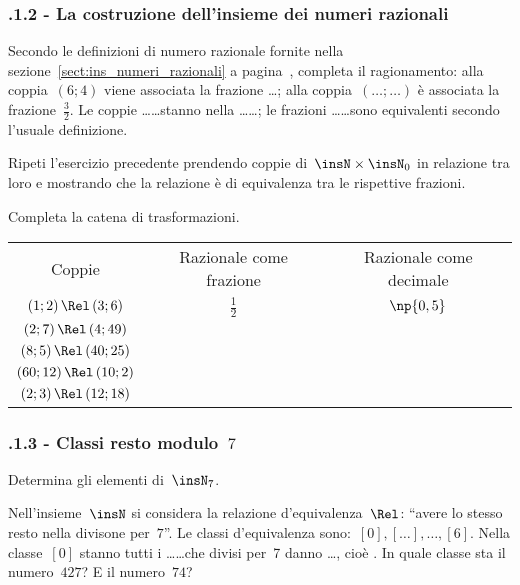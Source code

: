 \subsubsection*{\thechapter.1.2 - La costruzione dell'insieme dei numeri razionali}
\begin{esercizio}
\label{ese:E.3}
Secondo le definizioni di numero razionale fornite nella sezione~\ref{sect:ins_numeri_razionali} a pagina~\pageref{sect:ins_numeri_razionali},
completa il ragionamento: alla coppia~$(6;4)$ viene associata la frazione \ldots; alla coppia~$(\ldots; \ldots)$ è associata
la frazione~$\frac{3}{2}$. Le coppie \ldots\ldots stanno nella \ldots\ldots;
le frazioni \ldots\ldots sono equivalenti secondo l'usuale definizione.
\end{esercizio}

\begin{esercizio}
\label{ese:E.4}
Ripeti l'esercizio precedente prendendo coppie di~$\insN \times \insN_0$ in relazione tra loro e mostrando che la relazione è di equivalenza tra le rispettive frazioni.
\end{esercizio}

\begin{esercizio}
\label{ese:E.5}
Completa la catena di trasformazioni.
\begin {center}
\begin{tabular}{ccc}
 \toprule
  Coppie & Razionale come frazione & Razionale come decimale\\
  $(1;2)\,\Rel\,(3;6)$&$\frac{1}{2}$&$\np{0,5}$\\
  $(2;7)\,\Rel\,(4;49)$& & \\
  $(8;5)\,\Rel\,(40;25)$& & \\
  $(60;12)\,\Rel\,(10;2)$& & \\
  $(2;3)\,\Rel\,(12;18)$& & \\
  \bottomrule
 \end{tabular}
\end{center}
\end{esercizio}

\subsubsection*{\thechapter.1.3 - Classi resto modulo~$7$}
\begin{esercizio}
\label{ese:E.6}
Determina gli elementi di~$\insN_7$.

Nell'insieme~$\insN$ si considera la relazione d'equivalenza~$\Rel$:
``avere lo stesso resto nella divisone per~$7$''. Le classi d'equivalenza sono:~$[0], [\ldots], \ldots, [6]$.
Nella classe~$[0]$ stanno tutti i \ldots\ldots che divisi per~7 danno \ldots, cioè \dotfill.
In quale classe sta il numero~$427$? E il numero~$74$?
\end{esercizio}

